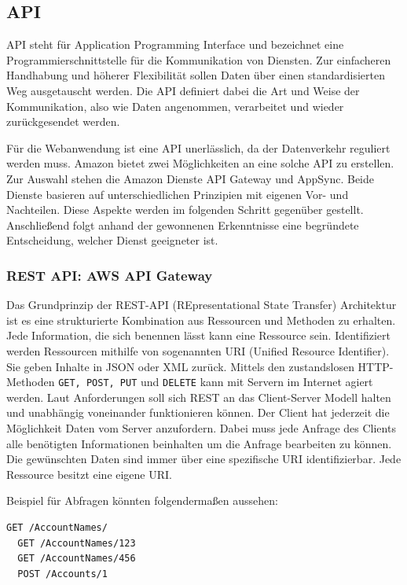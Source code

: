 

\subsection{API}
API steht für Application Programming Interface und bezeichnet eine Programmierschnittstelle für die Kommunikation von Diensten.
Zur einfacheren Handhabung und höherer Flexibilität sollen Daten über einen standardisierten Weg ausgetauscht werden. Die API definiert
dabei die Art und Weise der Kommunikation, also wie Daten angenommen, verarbeitet und wieder zurückgesendet werden.

Für die Webanwendung ist eine API unerlässlich, da der Datenverkehr reguliert werden muss.
Amazon bietet zwei Möglichkeiten an eine solche API zu erstellen.
Zur Auswahl stehen die Amazon Dienste API Gateway und AppSync.
Beide Dienste basieren auf unterschiedlichen Prinzipien mit eigenen Vor- und Nachteilen.
Diese Aspekte werden im folgenden Schritt gegenüber gestellt.
Anschließend folgt anhand der gewonnenen Erkenntnisse eine begründete Entscheidung, welcher Dienst geeigneter ist.


\subsubsection{REST API: AWS API Gateway}
Das Grundprinzip der REST-API (REpresentational State Transfer) Architektur ist es eine strukturierte Kombination aus Ressourcen und Methoden zu erhalten.
Jede Information, die sich benennen lässt kann eine Ressource sein.
Identifiziert werden Ressourcen mithilfe von sogenannten URI (Unified Resource Identifier).
Sie geben Inhalte in JSON oder XML zurück.
Mittels den zustandslosen HTTP-Methoden \verb+GET, POST, PUT+ und \verb+DELETE+ kann mit Servern im Internet agiert werden.
Laut Anforderungen soll sich REST an das Client-Server Modell halten und unabhängig voneinander funktionieren können.
Der Client hat jederzeit die Möglichkeit Daten vom Server anzufordern.
Dabei muss jede Anfrage des Clients alle benötigten Informationen beinhalten um die Anfrage bearbeiten zu können.
Die gewünschten Daten sind immer über eine spezifische URI identifizierbar.
Jede Ressource besitzt eine eigene URI.\cite[]{REST}

Beispiel für Abfragen könnten folgendermaßen aussehen:

\begin{lstlisting}[basicstyle=\ttfamily, breaklines=true , frame = single, backgroundcolor=\color{lightgray} ]
  GET /AccountNames/
  GET /AccountNames/123
  GET /AccountNames/456
  POST /Accounts/1
\end{lstlisting}

